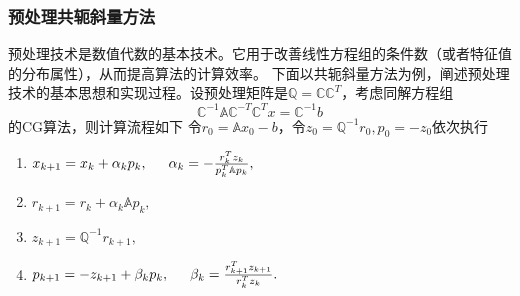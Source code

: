 \documentclass[10pt]{article}
\begin{document}
\subsubsection{预处理共轭斜量方法}
预处理技术是数值代数的基本技术。它用于改善线性方程组的条件数（或者特征值的分布属性），从而提高算法的计算效率。\newline
下面以共轭斜量方法为例，阐述预处理技术的基本思想和实现过程。设预处理矩阵是$\mathbb{Q} = \mathbb{C}\mathbb{C}^T$，考虑同解方程组$$\mathbb{C}^{-1}\mathbb{A}\mathbb{C}^{-T}\mathbb{C}^{T}x=\mathbb{C}^{-1}b$$的CG算法，则计算流程如下\newline
令$r_0=\mathbb{A}x_0-b$，令$z_0=\mathbb{Q}^{-1}r_0,p_0=-z_0$依次执行
\begin{enumerate}[]
	\item $x_{k+1}=x_k+\alpha_k p_k,\indent \alpha_k=-\frac{r_k^Tz_k}{p_k^T\mathbb{A}p_k},$
	\item $r_{k+1}=r_k+\alpha_k\mathbb{A}p_k,$
	\item $z_{k+1}=\mathbb{Q}^{-1}r_{k+1},$
	\item $p_{k+1}=-z_{k+1}+\beta_k p_k,\indent\beta_k=\frac{r_{k+1}^Tz_{k+1}}{r_k^Tz_k}.$
\end{enumerate}
  \newpage
  \pagestyle{fancynotes}
\end{document}
